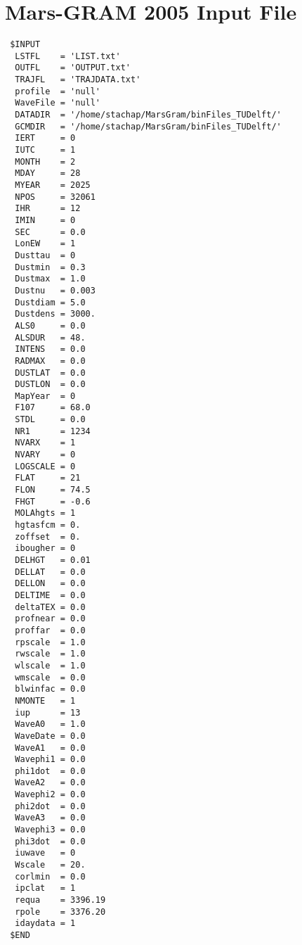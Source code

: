 \chapter{Mars-\ac{GRAM} 2005 Input File}
\label{app:appendixA-marsGRAM-inputFile}

\begin{lstlisting}
 $INPUT
  LSTFL    = 'LIST.txt'
  OUTFL    = 'OUTPUT.txt'
  TRAJFL   = 'TRAJDATA.txt'
  profile  = 'null'
  WaveFile = 'null'
  DATADIR  = '/home/stachap/MarsGram/binFiles_TUDelft/'
  GCMDIR   = '/home/stachap/MarsGram/binFiles_TUDelft/'
  IERT     = 0
  IUTC     = 1
  MONTH    = 2
  MDAY     = 28
  MYEAR    = 2025
  NPOS     = 32061
  IHR      = 12
  IMIN     = 0
  SEC      = 0.0
  LonEW    = 1
  Dusttau  = 0
  Dustmin  = 0.3
  Dustmax  = 1.0
  Dustnu   = 0.003
  Dustdiam = 5.0
  Dustdens = 3000.
  ALS0     = 0.0
  ALSDUR   = 48.
  INTENS   = 0.0
  RADMAX   = 0.0
  DUSTLAT  = 0.0
  DUSTLON  = 0.0
  MapYear  = 0
  F107     = 68.0
  STDL	   = 0.0
  NR1      = 1234
  NVARX    = 1
  NVARY    = 0
  LOGSCALE = 0
  FLAT     = 21
  FLON     = 74.5
  FHGT     = -0.6
  MOLAhgts = 1
  hgtasfcm = 0.
  zoffset  = 0.
  ibougher = 0
  DELHGT   = 0.01
  DELLAT   = 0.0
  DELLON   = 0.0
  DELTIME  = 0.0
  deltaTEX = 0.0
  profnear = 0.0
  proffar  = 0.0
  rpscale  = 1.0
  rwscale  = 1.0
  wlscale  = 1.0
  wmscale  = 0.0
  blwinfac = 0.0
  NMONTE   = 1
  iup      = 13
  WaveA0   = 1.0
  WaveDate = 0.0
  WaveA1   = 0.0
  Wavephi1 = 0.0
  phi1dot  = 0.0
  WaveA2   = 0.0
  Wavephi2 = 0.0
  phi2dot  = 0.0
  WaveA3   = 0.0
  Wavephi3 = 0.0
  phi3dot  = 0.0
  iuwave   = 0
  Wscale   = 20.
  corlmin  = 0.0
  ipclat   = 1
  requa    = 3396.19
  rpole    = 3376.20
  idaydata = 1
 $END


\end{lstlisting}

